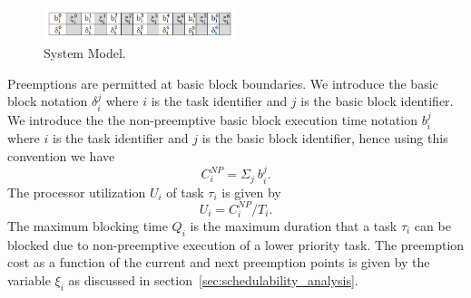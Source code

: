 \vspace{-5pt}
\begin{figure}[h!]
\begin{center}
\includegraphics[width=0.5\textwidth]{system_model.png}
\caption{System Model.}
\label{fig:system_model}
\end{center}
\vspace{-10pt}
\end{figure}
\noindent
Preemptions are permitted at basic block boundaries.  We introduce the basic block notation \begin{math}\delta_{i}^{j}\end{math} where $i$ is the task identifier and $j$ is the basic block identifier. We introduce the the non-preemptive basic block execution time notation \begin{math}b_{i}^{j}\end{math} where $i$ is the task identifier and $j$ is the basic block identifier, hence using this convention we have
\begin{equation}\label{eqn:c-np2}
    C_{i}^{NP} = \Sigma_{j}\ b_{i}^{j}.
\end{equation}
\noindent
The processor utilization \begin{math}U_{i}\end{math} of task \begin{math}\tau_{i}\end{math} is given by
\begin{equation}\label{eqn:u-task}
    U_{i} = C_{i}^{NP}/T_{i}.
\end{equation}
\noindent
The maximum blocking time $Q_i$ is the maximum duration that a task $\tau_i$ can be blocked due to non-preemptive execution of a lower priority task. The preemption cost as a function of the current
and next preemption points is given by the variable $\xi_{i}$ as discussed in section~\ref{sec:schedulability_analysis}.
